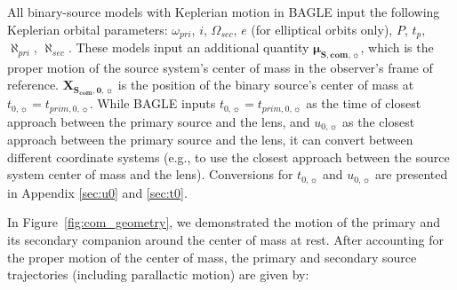 \documentclass[twocolumn]{aastex701}
\newcommand{\vect}[1]{\boldsymbol{#1}}
\newcommand{\tnot}{t_{0,\sun}}
\newcommand{\thetaE}{\theta_E}
\newcommand{\uo}{u_{0,\sun}}
\newcommand{\uocom}{u_{com, 0,\sun}}
\newcommand{\mussysvec}{\vect{\mu}_{\boldsymbol{S, com},\sun}}
\newcommand{\Xsovec}{\vect{X}_{\boldsymbol{S,0},\sun}}
\newcommand{\Xscomvec}{\vect{X}_{\boldsymbol{S_{com},0},\sun}}
\newcommand{\tpnot}{t_{prim,0,\sun}}
\newcommand{\tcomnot}{t_{com,0,\sun}}
\newcommand{\w}{\omega_{pri}}
\newcommand{\bigomega}{\Omega_{sec}}
\newcommand{\inclination}{\textit{i}}
\newcommand{\eccentricity}{\textit{e}}
\newcommand{\period}{\textit{P}}
\newcommand{\al}{\aleph_{pri}}
\newcommand{\ala}{\aleph_{sec}}
\begin{document}
All binary-source models with  Keplerian motion in BAGLE input the following Keplerian orbital parameters: $\w$, $\inclination$, $\bigomega$, $\eccentricity$ (for elliptical orbits only), $\period$, $t_p$, $\al$, $\ala$. These models input an additional quantity $\mussysvec$, which is the proper motion of the source system's center of mass in the observer's frame of reference. $\Xscomvec$ is the position of the binary source's center of mass at $\tnot=\tpnot$. While BAGLE inputs $\tnot = \tpnot$ as the time of closest approach between the primary source and the lens, and $\uo$ as the closest approach between the primary source and the lens, it can convert between different coordinate systems (e.g., to use the closest approach between the source system center of mass and the lens). Conversions for
$\tnot$ and $\uo$ are presented in Appendix \ref{sec:u0} and \ref{sec:t0}.




In Figure~\ref{fig:com_geometry}, we demonstrated the motion of the primary and its secondary companion around the center of mass at rest. After accounting for the proper motion of the center of mass, the primary and secondary source trajectories (including parallactic motion) are given by: 

\end{document}
